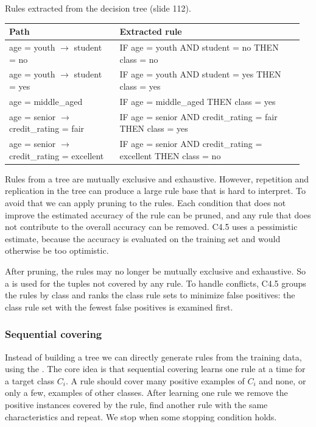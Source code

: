 \begin{example}
Rules extracted from the  decision tree (slide 112).
\begin{center}
\small
\begin{tabular}{@{}p{0.36\linewidth}p{0.6\linewidth}@{}}
  \toprule
  Path & Extracted rule \\
  \midrule
  age = youth $\to$ student = no & IF age = youth AND student = no THEN class = no \\
  age = youth $\to$ student = yes & IF age = youth AND student = yes THEN class = yes \\
  age = middle\_aged & IF age = middle\_aged THEN class = yes \\
  age = senior $\to$ credit\_rating = fair & IF age = senior AND credit\_rating = fair THEN class = yes \\
  age = senior $\to$ credit\_rating = excellent & IF age = senior AND credit\_rating = excellent THEN class = no \\
  \bottomrule
\end{tabular}
\end{center}
\end{example}

Rules from a tree are mutually exclusive and exhaustive. However, repetition and replication in the tree can produce a large rule base that is hard to interpret. To avoid that we can apply pruning to the rules. Each condition that does not improve the estimated accuracy of the rule can be pruned, and any rule that does not contribute to the overall accuracy can be removed. C4.5 uses a pessimistic estimate, because the accuracy is evaluated on the training set and would otherwise be too optimistic.

After pruning, the rules may no longer be mutually exclusive and exhaustive. So a  is used for the tuples not covered by any rule. To handle conflicts, C4.5 groups the rules by class and ranks the class rule sets to minimize false positives: the class rule set with the fewest false positives is examined first.

\subsubsection{Sequential covering}
Instead of building a tree we can directly generate rules from the training data, using the . The core idea is that sequential covering learns one rule at a time for a target class $C_i$. A rule should cover many positive examples of $C_i$ and none, or only a few, examples of other classes. After learning one rule we remove the positive instances covered by the rule, find another rule with the same characteristics and repeat. We stop when some stopping condition holds.


